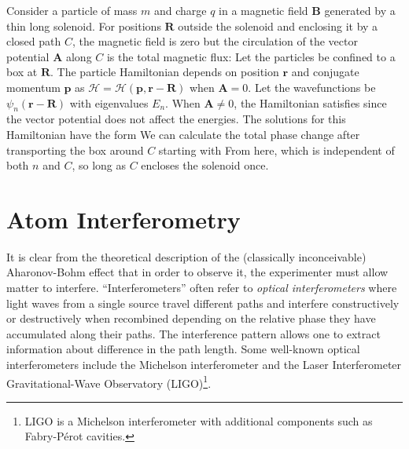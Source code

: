 \documentclass[reprint,
nofootinbib,
amsmath,amssymb,
aps]{revtex4-1}
\newcommand{\f}[2]{\frac{#1}{#2}}
\newcommand{\lb}{\left[}
\newcommand{\rb}{\right]}
\begin{document}
Consider a particle of mass $m$ and charge $q$ in a magnetic field $\bm{B}$ generated by a thin long solenoid. For positions $\bm{R}$ outside the solenoid and enclosing it by a closed path $C$, the magnetic field is zero but the circulation of the vector potential $\bm{A}$ along $C$ is the total magnetic flux:
Let the particles be confined to a box at $\bm{R}$. The particle Hamiltonian depends on position ${\bm{r}}$ and conjugate momentum $\bm{p}$ as $\mathcal{H} = \mathcal{H}(\bm{p}, \bm{r} - \bm{R})$ when $\bm{A} = 0$. Let the wavefunctions be $\psi_n(\bm{r} - \bm{R})$ with eigenvalues $E_n$.  When $\bm{A} \neq 0$, the Hamiltonian satisfies
since the vector potential does not affect the energies. The solutions for this Hamiltonian have the form
We can calculate the total phase change after transporting the box around $C$ starting with
From here,
which is independent of both $n$ and $C$, so long as $C$ encloses the solenoid once.



\section{Atom Interferometry} \label{sect:atom}

It is clear from the theoretical description of the (classically inconceivable) Aharonov-Bohm effect that in order to observe it, the experimenter must allow matter to {interfere}. ``Interferometers'' often refer to \textit{optical interferometers} where light waves from a single source travel different paths and interfere constructively or destructively when recombined depending on the relative phase they have accumulated along their paths. The interference pattern allows one to extract information about difference in the path length. Some well-known optical interferometers include the Michelson interferometer and the Laser Interferometer Gravitational-Wave Observatory (LIGO)\footnote{LIGO is a Michelson interferometer with additional components such as Fabry-P\'{e}rot cavities.}. 
\end{document}
